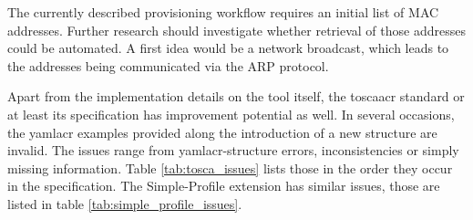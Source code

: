 The currently described provisioning workflow requires an initial list of MAC addresses. Further research should investigate whether retrieval of those addresses could be automated. A first idea would be a network broadcast, which leads to the addresses being communicated via the ARP protocol.

Apart from the implementation details on the tool itself, the \gls{toscaacr} standard or at least its specification has improvement potential as well. In several occasions, the \gls{yamlacr} examples provided along the introduction of a new structure are invalid. The issues range from \gls{yamlacr}-structure errors, inconsistencies or simply missing information. Table \ref{tab:tosca_issues} lists those in the order they occur in the specification. The Simple-Profile extension has similar issues, those are listed in table \ref{tab:simple_profile_issues}.



